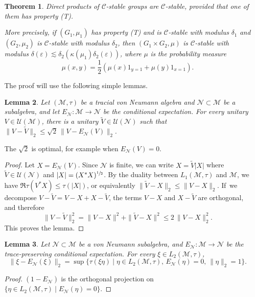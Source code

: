 \documentclass[JEP,XML,SOM,Unicode,published]{cedram}
\theoremstyle{plain}
\newtheorem{theorem}{Theorem}[section]
\newtheorem{lemma}[theorem]{Lemma}
\theoremstyle{definition}
\newcommand{\cM}{\mathcal{M}}
\newcommand{\cN}{\mathcal{N}}
\newcommand{\vn}{\mathcal{C}}
\newcommand{\cU}{\mathcal{U}}
\begin{document}
\begin{theorem}\label{thm:stability_direct_product} Direct products of $\vn$-stable groups are $\vn$-stable, provided that one of them has property (T).

More precisely, if $(G_1,\mu_1)$ has property (T) and is $\vn$-stable with modulus $\delta_1$ and $(G_2,\mu_2)$ is $\vn$-stable with modulus $\delta_2$, then $(G_1 \times G_2,\mu)$ is $\vn$-stable with modulus $\delta(\varepsilon) \lesssim \delta_2(\kappa(\mu_1) \delta_2(\varepsilon))$, where $\mu$ is the probability measure
\[
\mu(x,y) = \frac{1}{2}(\mu(x) 1_{y=1}+\mu(y) 1_{x=1}).
\]
\end{theorem}
The proof will use the following simple lemmas.
\begin{lemma}\label{eq:almost-unitary_close_to_unitary} Let $(\cM,\tau)$ be a tracial von Neumann algebra and $\cN\subset\cM$ be a subalgebra, and let $E_\cN:\cM \to \cN$ be the conditional expectation. For every unitary $V \in \cU(\cM)$, there is a unitary $\tilde{V}\in\cU(\cN)$ such that $\|V-\tilde{V}\|_2 \leq \sqrt{2}\, \|V-E_\cN(V)\|_2$.
\end{lemma}
The $\sqrt{2}$ is optimal, for example when $E_\cN(V)=0$.
\begin{proof} Let $X = E_\cN(V)$. Since $\cN$ is finite, we can write $X=\tilde{V}|X|$ where $\tilde{V} \in\cU(\cN)$ and $|X|=(X^*X)^{\sfrac 1 2}$. By the duality between $L_1(\cM,\tau)$ and $\cM$, we have $\Re \tau(V^*X) \leq\tau(|X|)$, or equivalently $\|\tilde{V}-X\|_2 \leq \|V-X\|_2$. If~we decompose $V-\tilde{V} = V-X + X-\tilde{V}$, the terms $V-X$ and $X-\tilde{V}$ are orthogonal, and therefore
\[
\|V-\tilde{V}\|_2^2 = \|V-X\|^2 + \|\tilde{V}-X\|^2 \leq 2\,\|V-X\|_2^2.
\]
This proves the lemma.
\end{proof}
\begin{lemma}\label{eq:norm_of_conditional_exp} Let $\cN\subset\cM$ be a von Neumann subalgebra, and $E_\cN:\cM\to\cN$ be the trace-preserving conditional expectation. For every $\xi \in L_2(\cM,\tau)$,
\[
\|\xi - E_\cN(\xi)\|_2 = \sup\{\tau(\xi \eta) \mid \eta \in L_2(\cM,\tau),\, E_\cN(\eta)=0,\,\|\eta\|_2 = 1\}.
\]
\end{lemma}
\begin{proof}
$(1-E_\cN)$ is the orthogonal projection on $\{\eta \in L_2(\cM,\tau) \mid E_\cN(\eta)=0\}$.
\end{proof}
\end{document}
